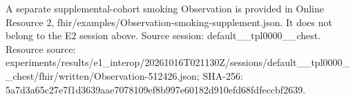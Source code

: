 A separate supplemental-cohort smoking Observation is provided in Online Resource 2, fhir/examples/Observation-smoking-supplement.json. It does not belong to the E2 session above. Source session: default\_\_tpl0000\_\_chest. Resource source: experiments/\allowbreak{}results/e1\_i\allowbreak{}nterop/20261\allowbreak{}016T021130Z/\allowbreak{}sessions/def\allowbreak{}ault\_\_tpl000\allowbreak{}0\_\_chest/fhi\allowbreak{}r/written/Ob\allowbreak{}servation-51\allowbreak{}2426.json; SHA-256: 5a7d3a65c27e\allowbreak{}7f1d3639aae7\allowbreak{}078109ef8b99\allowbreak{}7e60182d910e\allowbreak{}fd68fdfeccbf\allowbreak{}2639.
